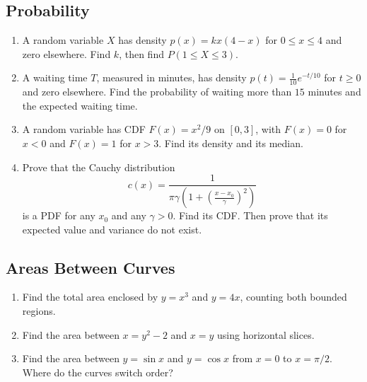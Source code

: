 \documentclass{article}
\begin{document}
\subsection{Probability}

\begin{enumerate}
\item A random variable $X$ has density $p(x)=kx(4-x)$ for $0\leq x\leq 4$ and zero elsewhere. Find $k$, then find $P(1\leq X\leq 3)$.
\item A waiting time $T$, measured in minutes, has density $p(t)=\tfrac{1}{10}e^{-t/10}$ for $t\geq 0$ and zero elsewhere. Find the probability of waiting more than $15$ minutes and the expected waiting time.
\item A random variable has CDF $F(x)=x^2/9$ on $[0,3]$, with $F(x)=0$ for $x<0$ and $F(x)=1$ for $x>3$. Find its density and its median.
\item Prove that the Cauchy distribution 
$$c(x)=\frac{1}{\pi\gamma\left(1+\left(\frac{x-x_0}{\gamma}\right)^2\right)}$$
is a PDF for any $x_0$ and any $\gamma>0$. Find its CDF. Then prove that its expected value and variance do not exist.
\end{enumerate}


\subsection{Areas Between Curves}
\begin{enumerate}
\item Find the total area enclosed by $y=x^3$ and $y=4x$, counting both bounded regions.
\item Find the area between $x=y^2-2$ and $x=y$ using horizontal slices.
\item Find the area between $y=\sin x$ and $y=\cos x$ from $x=0$ to $x=\pi/2$. Where do the curves switch order?
\end{enumerate}
\end{document}
